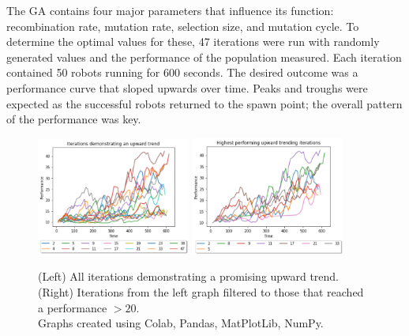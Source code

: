 \documentclass{article}
\begin{document}
The GA contains four major parameters that influence its function: recombination rate, mutation rate, selection size, and mutation cycle. To determine the optimal values for these, 47 iterations were run with randomly generated values and the performance of the population measured. Each iteration contained 50 robots running for 600 seconds.
The desired outcome was a performance curve that sloped upwards over time. Peaks and troughs were expected as the successful robots returned to the spawn point; the overall pattern of the performance was key. 
\begin{figure}[H]
\centering
\includegraphics[width=0.45\textwidth]{gaPatternIterations}
\includegraphics[width=0.45\textwidth]{gafilteredIterations}
\caption{(Left) All iterations demonstrating a promising upward trend.\\
(Right) Iterations from the left graph filtered to those that reached a performance $>20$.\\
Graphs created using Colab, \citep{colab} Pandas, \citep{pd} MatPlotLib, \citep{plt} NumPy. \citep{np}}
\end{figure}
\end{document}
